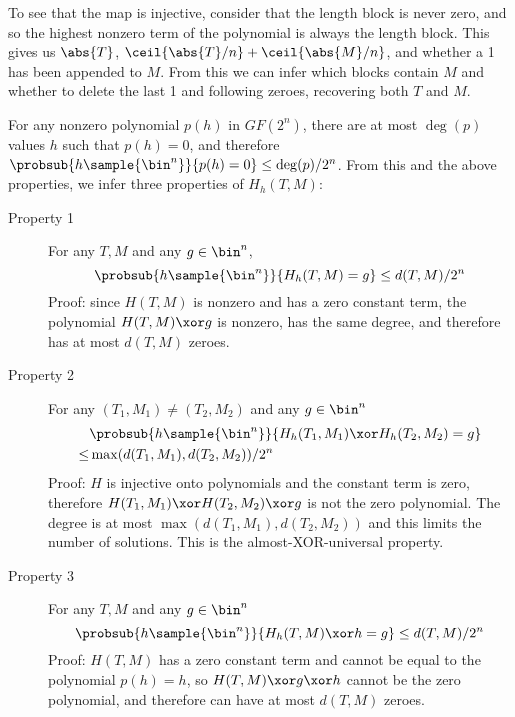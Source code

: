 \documentclass[hctr.tex]{subfiles}
\begin{document}
To see that the map is injective,
consider that the length block is never zero,
and so the highest nonzero term of the polynomial
is always the length block. This gives us
\(\abs{T}\), \(\ceil{\abs{T}/n} + \ceil{\abs{M}/n}\),
and whether a 1 has been appended to \(M\).
From this we can infer which blocks contain \(M\)
and whether to delete the last 1 and following zeroes,
recovering both \(T\) and \(M\).

For any nonzero polynomial \(p(h)\)
in \(GF(2^n)\), there are at most \(\deg(p)\) values \(h\)
such that \(p(h) = 0\), and therefore
\(\probsub{h\sample{\bin^n}}{p(h) = 0} \leq \deg(p)/2^n\).
From this and the above properties,
we infer three properties of \(H_h(T, M)\):
\begin{description}
    \item[Property 1]
    For any \(T, M\) and any \(g \in \bin^n\),
    \begin{displaymath}
        \probsub{h\sample{\bin^n}}{H_h(T, M) = g} \leq d(T, M)/2^n
    \end{displaymath}
    Proof: since \(H(T, M)\) is nonzero and has
    a zero constant term,
    the polynomial \(H(T, M) \xor g\) 
    is nonzero,
    has the same degree,
    and therefore has at most \(d(T, M)\) zeroes.
    \item[Property 2] 
    For any \((T_1, M_1) \neq (T_2, M_2)\) and any \(g \in \bin^n\)
    \begin{align*}
        & \probsub{h\sample{\bin^n}}{H_h(T_1, M_1) \xor H_h(T_2, M_2) = g} \\
        \leq  & \max(d(T_1, M_1), d(T_2, M_2))/2^n
    \end{align*}
    Proof: \(H\) is injective onto polynomials
    and the constant term is zero, therefore
    \(H(T_1, M_1) \xor H(T_2, M_2) \xor g\)
    is not the zero polynomial.
    The degree is at most \(\max(d(T_1, M_1), d(T_2, M_2))\)
    and this limits the number of solutions.
    This is the almost-XOR-universal property.
    \item[Property 3]
    For any \(T, M\) and any \(g \in \bin^n\)
    \begin{displaymath}
        \probsub{h\sample{\bin^n}}{H_h(T, M) \xor h = g} \leq d(T, M)/2^n
    \end{displaymath}
    Proof: \(H(T, M)\) has a zero constant term and
    cannot be equal to the polynomial \(p(h) = h\),
    so \(H(T, M) \xor g \xor h\) cannot be the zero polynomial, and
    therefore can have at most \(d(T, M)\) zeroes.
\end{description}
\end{document}
